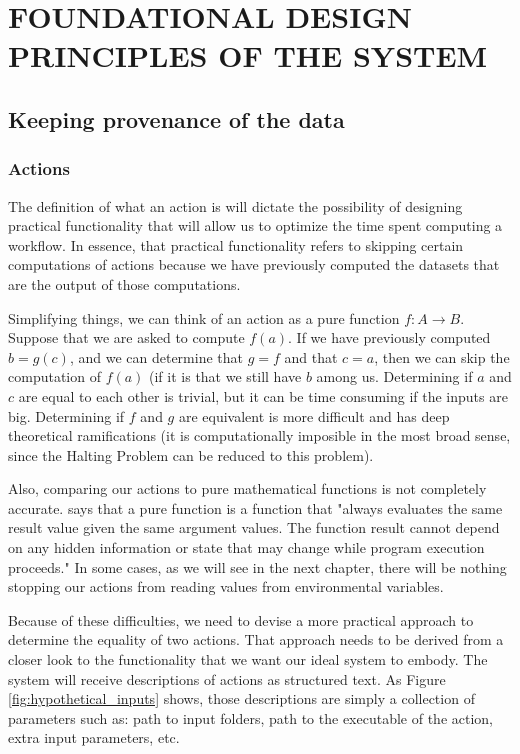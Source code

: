 \chapter{FOUNDATIONAL DESIGN PRINCIPLES OF THE SYSTEM}
\section{Keeping provenance of the data}
\subsection{Actions}

The definition of what an action is will dictate the possibility of designing practical functionality that will allow us to optimize the time spent computing a workflow.  In essence, that practical functionality refers to skipping certain computations of actions because we have previously computed the datasets that are the output of those computations. 

Simplifying things, we can think of an action as a pure function $f:A \rightarrow B$.  Suppose that we are asked to compute $f(a)$.  If we have previously computed $b=g(c)$, and we can determine that $g=f$ and that $c=a$, then we can skip the computation of $f(a)$ (if it is that we still have $b$ among us.  Determining if $a$ and $c$ are equal to each other is trivial, but it can be time consuming if the inputs are big.  Determining if $f$ and $g$ are equivalent is more difficult and has deep theoretical ramifications (it is computationally imposible in the most broad sense, since the Halting Problem can be reduced to this problem).

Also, comparing our actions to pure mathematical functions is not completely accurate.  \cite{wiki:pure_function} says that a pure function is a function that "always evaluates the same result value given the same argument values.  The function result cannot depend on any hidden information or state that may change while program execution proceeds." In some cases, as we will see in the next chapter, there will be nothing stopping our actions from reading values from environmental variables.

Because of these difficulties, we need to devise a more practical approach to determine the equality of two actions.  That approach needs to be derived from a closer look to the functionality that we want our ideal system to embody.  The system will receive descriptions of actions as structured text.  As Figure \ref{fig:hypothetical_inputs} shows, those descriptions are simply a collection of parameters such as: path to input folders, path to the executable of the action, extra input parameters, etc.

